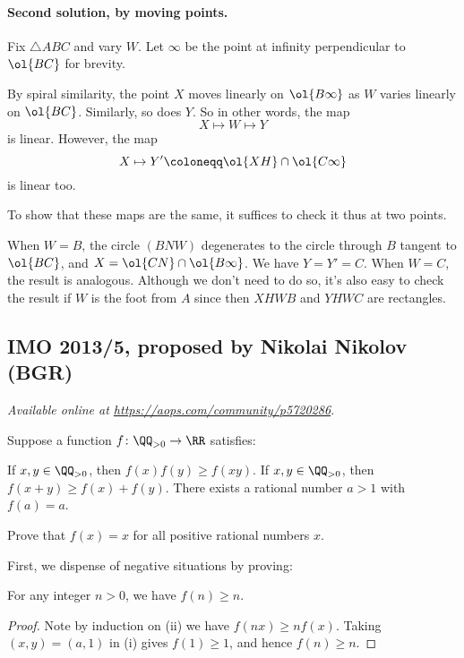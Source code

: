 \documentclass[11pt]{scrartcl}
\begin{document}
\paragraph{Second solution, by moving points.}
Fix $\triangle ABC$ and vary $W$.
Let $\infty$ be the point at infinity perpendicular to $\ol{BC}$
for brevity.

By spiral similarity, the point $X$ moves linearly on $\ol{B\infty}$
as $W$ varies linearly on $\ol{BC}$.
Similarly, so does $Y$.
So in other words, the map \[ X \mapsto W \mapsto Y \]
is linear.
However, the map \[ X \mapsto Y' \coloneqq \ol{XH} \cap \ol{C\infty} \]
is linear too.

To show that these maps are the same,
it suffices to check it thus at two points.
\begin{itemize}
  \ii When $W = B$, the circle $(BNW)$
  degenerates to the circle through $B$ tangent to $\ol{BC}$,
  and $X = \ol{CN} \cap \ol{B\infty}$.
  We have $Y = Y' = C$.
  \ii When $W = C$, the result is analogous.
  \ii Although we don't need to do so,
  it's also easy to check the result if $W$
  is the foot from $A$
  since then $XHWB$ and $YHWC$ are rectangles.
\end{itemize}
\pagebreak

\subsection{IMO 2013/5, proposed by Nikolai Nikolov (BGR)}
\textsl{Available online at \url{https://aops.com/community/p5720286}.}
\begin{mdframed}[style=mdpurplebox,frametitle={Problem statement}]
Suppose a function $f \colon \QQ_{>0} \to \RR$ satisfies:
\begin{enumerate}
  \ii [(i)] If $x,y \in \QQ_{>0}$, then $f(x)f(y) \ge f(xy)$.
  \ii [(ii)] If $x,y \in \QQ_{>0}$, then $f(x+y) \ge f(x) + f(y)$.
  \ii [(iii)] There exists a rational number $a > 1$ with $f(a) = a$.
\end{enumerate}
Prove that $f(x) = x$ for all positive rational numbers $x$.
\end{mdframed}
First, we dispense of negative situations by proving:
\begin{claim*}
  For any integer $n > 0$, we have $f(n) \ge n$.
\end{claim*}
\begin{proof}
  Note by induction on (ii) we have $f(nx) \ge n f(x)$.
  Taking $(x,y) = (a,1)$ in (i) gives $f(1) \ge 1$,
  and hence $f(n) \ge n$.
\end{proof}
\end{document}
